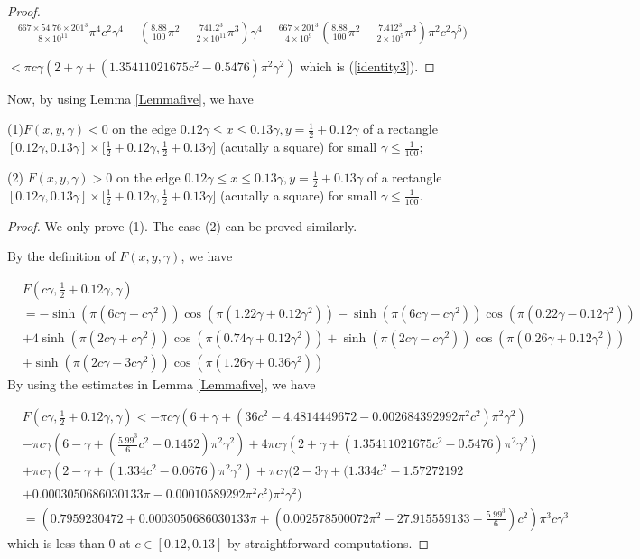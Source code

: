 \documentclass[12pt]{amsart}
\begin{document}
\begin{proof}
$-\frac{667\times54.76\times201^{3}}{8\times10^{11}}\pi^{4}c^{2}\gamma
^{4}-(\frac{8.88}{100}\pi^{2}-\frac{741.2^{3}}{2\times10^{11}}\pi^{3}%
)\gamma^{4}-\frac{667\times201^{3}}{4\times10^{9}}(\frac{8.88}{100}\pi
^{2}-\frac{7.412^{3}}{2\times10^{5}}\pi^{3})\pi^{2}c^{2}\gamma^{5})$

$<\pi c\gamma(2+\gamma+(1.35411021675c^{2}-0.5476)\pi^{2}\gamma^{2})$
which is (\ref{identity3}).   


\end{proof}

Now, by using Lemma \ref{Lemmafive}, we have 
\begin{lemma} \label{lemma-F}
(1)$F(x,y,\gamma)<0$ on the edge $0.12\gamma\leq x\leq0.13\gamma,y=\frac{1}%
{2}+0.12\gamma$ of a rectangle $[0.12\gamma,0.13\gamma]\times\lbrack\frac
{1}{2}+0.12\gamma,\frac{1}{2}+0.13\gamma]$ (acutally a square) for small
$\gamma\leq\frac{1}{100}$;

(2) $F(x,y,\gamma)>0$ on the edge $0.12\gamma\leq x\leq0.13\gamma,y=\frac
{1}{2}+0.13\gamma$ of a rectangle $[0.12\gamma,0.13\gamma]\times\lbrack
\frac{1}{2}+0.12\gamma,\frac{1}{2}+0.13\gamma]$ (acutally a square) for small
$\gamma\leq\frac{1}{100}$.
\end{lemma}
\begin{proof}
We only prove (1). The case (2) can be proved similarly. 

   By the definition of $F(x,y,\gamma)$, we have

\begin{align}
 &F(c\gamma,\frac{1}{2}+0.12\gamma,\gamma)\\\nonumber
 &=-\sinh(\pi(6c\gamma+c\gamma^{2}))\cos(\pi(1.22\gamma+0.12\gamma^{2}%
))-\sinh(\pi(6c\gamma-c\gamma^{2}))\cos(\pi(0.22\gamma-0.12\gamma^{2}))\\\nonumber
&+4\sinh(\pi(2c\gamma+c\gamma^{2}))\cos(\pi(0.74\gamma+0.12\gamma^{2}%
))+\sinh(\pi(2c\gamma-c\gamma^{2}))\cos(\pi(0.26\gamma+0.12\gamma^{2}%
))\\\nonumber
&+\sinh(\pi(2c\gamma-3c\gamma^{2}))\cos(\pi(1.26\gamma+0.36\gamma^{2}))
\end{align}
By using the estimates in Lemma \ref{Lemmafive}, we have

\begin{align}
    &F(c\gamma,\frac{1}{2}+0.12\gamma,\gamma)<-\pi c\gamma(6+\gamma+(36c^{2}-4.4814449672-0.002684392992\pi^{2}c^{2}%
)\pi^{2}\gamma^{2})\\\nonumber
&-\pi c\gamma(6-\gamma+(\frac{5.99^{3}}{6}c^{2}%
-0.1452)\pi^{2}\gamma^{2})+4\pi c\gamma(2+\gamma+(1.35411021675c^{2}%
-0.5476)\pi^{2}\gamma^{2})\\\nonumber
&+\pi c\gamma(2-\gamma+(1.334c^{2}-0.0676)\pi^{2}\gamma^{2})+\pi
c\gamma(2-3\gamma+(1.334c^{2}-1.57272192\\\nonumber
&+0.0003050686030133\pi
-0.00010589292\pi^{2}c^{2})\pi^{2}\gamma^{2})\\\nonumber
&=(0.7959230472+0.0003050686030133\pi+(0.002578500072\pi^{2}%
-27.915559133-\frac{5.99^{3}}{6})c^{2})\pi^{3}c\gamma^{3}
\end{align}
which is less than $0$ at $c\in [0.12,0.13]$ by straightforward computations.  
\end{proof}
\end{document}
